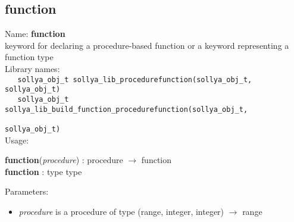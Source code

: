\subsection{function}
\label{labfunction}
\noindent Name: \textbf{function}\\
\phantom{aaa}keyword for declaring a procedure-based function or a keyword representing a \textsf{function} type \\[0.2cm]
\noindent Library names:\\
\verb|   sollya_obj_t sollya_lib_procedurefunction(sollya_obj_t, sollya_obj_t)|\\
\verb|   sollya_obj_t sollya_lib_build_function_procedurefunction(sollya_obj_t,|\\
\verb|                                                            sollya_obj_t)|\\[0.2cm]
\noindent Usage: 
\begin{center}
\textbf{function}(\emph{procedure})  : \textsf{procedure} $\rightarrow$ \textsf{function}\\
\textbf{function} : \textsf{type type}\\
\end{center}
Parameters: 
\begin{itemize}
\item \emph{procedure} is a procedure of type (\textsf{range}, \textsf{integer}, \textsf{integer}) $\rightarrow$ \textsf{range}
\end{itemize}
